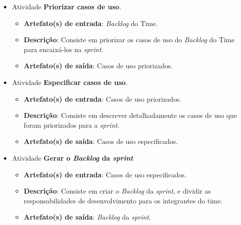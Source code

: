 \begin{itemize}
\begin{itemize}
	    \item Atividade \textbf{Priorizar casos de uso}.
	      
		  \begin{itemize}
		    \item \textbf{Artefato(s) de entrada}: \textit{Backlog} do Time.
		    
		    \item \textbf{Descrição}: Consiste em priorizar os casos de uso do \textit{Backlog} do Time para
		      encaixá-los na \textit{sprint}.
		    
		    \item \textbf{Artefato(s) de saída}: Casos de uso priorizados.
			  
		  \end{itemize}
		  
	    \item Atividade \textbf{Especificar casos de uso}.
	    
		\begin{itemize}
		  \item \textbf{Artefato(s) de entrada}: Casos de uso priorizados.
		  
		  \item \textbf{Descrição}: Consiste em descrever detalhadamente os casos de uso que foram priorizados para a
		    \textit{sprint}.
		  
		  \item \textbf{Artefato(s) de saída}: Casos de uso especificados.
			
		\end{itemize}
	    
	    \item Atividade \textbf{Gerar o \textit{Backlog} da \textit{sprint}}
	      
		  \begin{itemize}
		    \item \textbf{Artefato(s) de entrada}: Casos de uso especificados.
		    
		    \item \textbf{Descrição}: Consiste em criar o \textit{Backlog} da \textit{sprint}, e dividir as
		      responsabilidades de desenvolvimento para os integrantes do time.
		    
		    \item \textbf{Artefato(s) de saída}: \textit{Backlog} da \textit{sprint}.
			  
		  \end{itemize}
	\end{itemize}	  
	  

\end{itemize}
